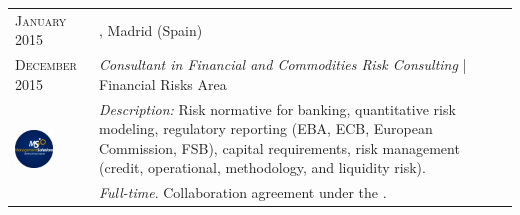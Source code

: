 \begin{longtable}{R{2.5cm}|p{14.8cm}}
	\textsc{January 2015} & \textsc{}, \faMapMarker \hspace{0.5 mm} Madrid (Spain) \\
 	\textsc{December 2015} 	& \textit{Consultant in Financial and Commodities Risk Consulting} | Financial Risks Area  \\
	 & 
 	\footnotesize{\faTasks \emph{ Description: }Risk normative for banking, quantitative risk modeling, regulatory reporting (EBA, ECB, European Commission, FSB), capital requirements, risk management (credit, operational, methodology, and liquidity risk).} \\ &
	\footnotesize{\faFileText \emph{ Full-time}. Collaboration agreement under the .} \\

	
\end{longtable}

\vspace{4 mm}
